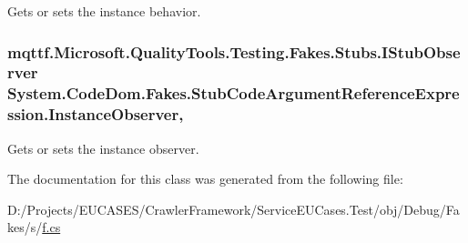 Gets or sets the instance behavior.

\hypertarget{class_system_1_1_code_dom_1_1_fakes_1_1_stub_code_argument_reference_expression_a68986f9680bb5c2c583bf4a842bb1823}{
\subsubsection[{Instance\-Observer}]{\setlength{\rightskip}{0pt plus 5cm}mqttf.\-Microsoft.\-Quality\-Tools.\-Testing.\-Fakes.\-Stubs.\-I\-Stub\-Observer System.\-Code\-Dom.\-Fakes.\-Stub\-Code\-Argument\-Reference\-Expression.\-Instance\-Observer\hspace{0.3cm}{\ttfamily [get]}, {\ttfamily [set]}}}\label{class_system_1_1_code_dom_1_1_fakes_1_1_stub_code_argument_reference_expression_a68986f9680bb5c2c583bf4a842bb1823}


Gets or sets the instance observer.



The documentation for this class was generated from the following file\-:\begin{DoxyCompactItemize}
\item 
D\-:/\-Projects/\-E\-U\-C\-A\-S\-E\-S/\-Crawler\-Framework/\-Service\-E\-U\-Cases.\-Test/obj/\-Debug/\-Fakes/s/\hyperlink{s_2f_8cs}{f.\-cs}\end{DoxyCompactItemize}
